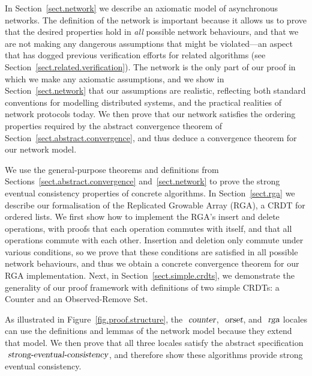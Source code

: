 In Section~\ref{sect.network} we describe an axiomatic model of asynchronous networks.
The definition of the network is important because it allows us to prove that the desired properties hold in \emph{all} possible network behaviours, and that we are not making any dangerous assumptions that might be violated---an aspect that has dogged previous verification efforts for related algorithms (see Section~\ref{sect.related.verification}).
The network is the only part of our proof in which we make any axiomatic assumptions, and we show in Section~\ref{sect.network} that our assumptions are realistic, reflecting both standard conventions for modelling distributed systems, and the practical realities of network protocols today.
We then prove that our network satisfies the ordering properties required by the abstract convergence theorem of Section~\ref{sect.abstract.convergence}, and thus deduce a convergence theorem for our network model.

We use the general-purpose theorems and definitions from Sections~\ref{sect.abstract.convergence} and~\ref{sect.network} to prove the strong eventual consistency properties of concrete algorithms.
In Section~\ref{sect.rga} we describe our formalisation of the Replicated Growable Array (RGA), a CRDT for ordered lists.
We first show how to implement the RGA's insert and delete operations, with proofs that each operation commutes with itself, and that all operations commute with each other.
Insertion and deletion only commute under various conditions, so we prove that these conditions are satisfied in all possible network behaviours, and thus we obtain a concrete convergence theorem for our RGA implementation.
Next, in Section~\ref{sect.simple.crdts}, we demonstrate the generality of our proof framework with definitions of two simple CRDTs: a Counter and an Observed-Remove Set.

As illustrated in Figure~\ref{fig.proof.structure}, the $\isa{counter}$, $\isa{orset}$, and $\isa{rga}$ locales can use the definitions and lemmas of the network model because they extend that model.
We then prove that all three locales satisfy the abstract specification $\isa{strong-eventual-consistency}$, and therefore show these algorithms provide strong eventual consistency.

